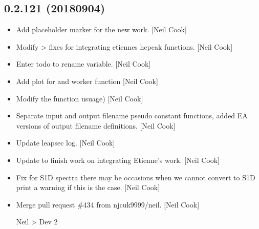 \documentclass[a4paper,10pt,english]{report}
\begin{document}
\subsection{0.2.121 (2018\sphinxhyphen{}09\sphinxhyphen{}04)}
\label{\detokenize{misc/changelog:id359}}\begin{itemize}
\item {} 
Add placeholder marker for the new  work. {[}Neil
Cook{]}

\item {} 
Modify  \textendash{}\textgreater{} fixes for integrating etiennes
hcpeak functions. {[}Neil Cook{]}

\item {} 
Enter todo to rename variable. {[}Neil Cook{]}

\item {} 
Add plot for   and
worker function  {[}Neil Cook{]}

\item {} 
Modify the  function  usuage) {[}Neil Cook{]}

\item {} 
Separate input and output filename pseudo constant functions, added EA
versions of  output filename definitions. {[}Neil Cook{]}

\item {} 
Update leapsec log. {[}Neil Cook{]}

\item {} 
Update to  \sphinxhyphen{} finish work on integrating Etienne’s
work. {[}Neil Cook{]}

\item {} 
Fix for S1D spectra \sphinxhyphen{} there may be occasions when we cannot convert to
S1D \sphinxhyphen{} print a warning if this is the case. {[}Neil Cook{]}

\item {} 
Merge pull request \#434 from njcuk9999/neil. {[}Neil Cook{]}

Neil \textendash{}\textgreater{} Dev 2

\end{itemize}
\end{document}
